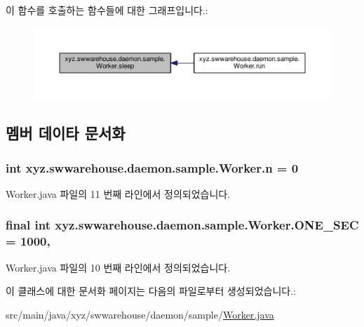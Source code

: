 이 함수를 호출하는 함수들에 대한 그래프입니다.\-:
\nopagebreak
\begin{figure}[H]
\begin{center}
\leavevmode
\includegraphics[width=350pt]{classxyz_1_1swwarehouse_1_1daemon_1_1sample_1_1_worker_ae9991783aa9ada529a18ecb5abdb4ad7_icgraph}
\end{center}
\end{figure}




\subsection{멤버 데이타 문서화}
\hypertarget{classxyz_1_1swwarehouse_1_1daemon_1_1sample_1_1_worker_aba3c26c1febb4e19bfc9562306bcee80}{
\subsubsection[{n}]{\setlength{\rightskip}{0pt plus 5cm}int xyz.\-swwarehouse.\-daemon.\-sample.\-Worker.\-n = 0\hspace{0.3cm}{\ttfamily [private]}}}\label{classxyz_1_1swwarehouse_1_1daemon_1_1sample_1_1_worker_aba3c26c1febb4e19bfc9562306bcee80}


Worker.\-java 파일의 11 번째 라인에서 정의되었습니다.

\hypertarget{classxyz_1_1swwarehouse_1_1daemon_1_1sample_1_1_worker_a285c9ea5eebf4bb083140ca18048961a}{
\subsubsection[{O\-N\-E\-\_\-\-S\-E\-C}]{\setlength{\rightskip}{0pt plus 5cm}final int xyz.\-swwarehouse.\-daemon.\-sample.\-Worker.\-O\-N\-E\-\_\-\-S\-E\-C = 1000\hspace{0.3cm}{\ttfamily [static]}, {\ttfamily [private]}}}\label{classxyz_1_1swwarehouse_1_1daemon_1_1sample_1_1_worker_a285c9ea5eebf4bb083140ca18048961a}


Worker.\-java 파일의 10 번째 라인에서 정의되었습니다.



이 클래스에 대한 문서화 페이지는 다음의 파일로부터 생성되었습니다.\-:\begin{DoxyCompactItemize}
\item 
src/main/java/xyz/swwarehouse/daemon/sample/\hyperlink{_worker_8java}{Worker.\-java}\end{DoxyCompactItemize}
